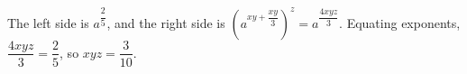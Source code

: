The left side is $a^{\dfrac25}$, and the right side is $\left(a^{xy+\dfrac{xy}3}\right)^z=a^{\dfrac{4xyz}{3}}$. Equating exponents, $\dfrac{4xyz}{3}=\dfrac25$, so $xyz=\boxed{\dfrac3{10}}$.
